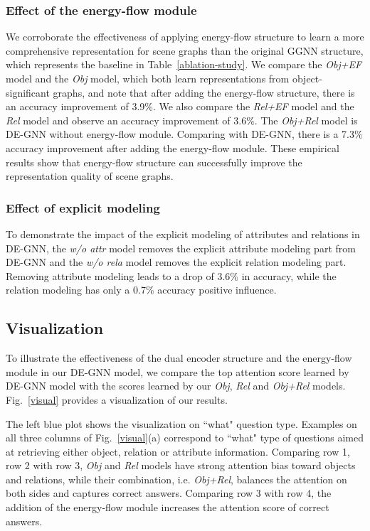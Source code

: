 \documentclass[letterpaper]{article} %
\begin{document}
\subsubsection{Effect of the energy-flow module} We corroborate the effectiveness of applying energy-flow structure to learn a more comprehensive representation for scene graphs than the original GGNN structure, which represents the baseline in Table~\ref{ablation-study}. 
We compare the \emph{Obj+EF} model and the \emph{Obj} model, which both learn representations from object-significant graphs, and note that after adding the energy-flow structure, there is an accuracy improvement of 3.9\%. 
We also compare the \emph{Rel+EF} model and the \emph{Rel} model and observe an accuracy improvement of 3.6\%. 
The \emph{Obj+Rel} model is DE-GNN without energy-flow module. 
Comparing with DE-GNN, there is a 7.3\% accuracy improvement after adding the energy-flow module. 
These empirical results show that energy-flow structure can successfully improve the representation quality of scene graphs. 

\subsubsection{Effect of explicit modeling} To demonstrate the impact of the explicit modeling of attributes and relations in DE-GNN, the \emph{w/o attr} model removes the explicit attribute modeling part from DE-GNN and the \emph{w/o rela} model removes the explicit relation modeling part. 
Removing attribute modeling leads to a drop of 3.6\% in accuracy, while the relation modeling has only a 0.7\% accuracy positive influence.



\subsection{Visualization}
To illustrate the effectiveness of the dual encoder structure and the energy-flow module in our DE-GNN model, we compare the top attention score learned by DE-GNN model with the scores learned by our \emph{Obj}, \emph{Rel} and \emph{Obj+Rel} models. 
Fig.~\ref{visual} provides a visualization of our results.

The left blue plot shows the visualization on ``what" question type. 
Examples on all three columns of Fig.~\ref{visual}(a) correspond to ``what" type of questions aimed at retrieving either object, relation or attribute information. 
Comparing row 1, row 2 with row 3, \emph{Obj} and \emph{Rel} models have strong attention bias toward objects and relations, while their combination, i.e. \emph{Obj+Rel}, balances the attention on both sides and captures correct answers. 
Comparing row 3 with row 4, the addition of the energy-flow module increases the attention score of correct answers. 
\end{document}
